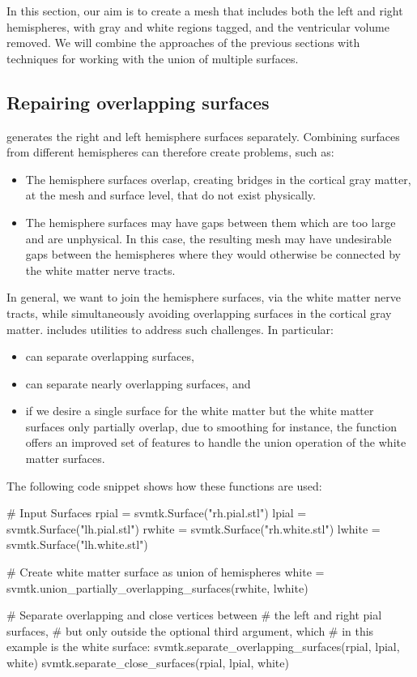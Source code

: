 In this section, our aim is to create a mesh that includes both the
left and right hemispheres, with gray and white regions tagged, and
the ventricular volume removed. We will combine the approaches of the
previous sections with \svmtk{} techniques for
working with the union of multiple surfaces. 

\subsection{Repairing overlapping surfaces}
\freesurfer{} generates the right and left hemisphere surfaces
separately. Combining surfaces from different hemispheres
can therefore create problems, such as:
\begin{itemize}
\item The hemisphere surfaces overlap, creating bridges in the cortical gray 
matter, at the mesh and surface level, that do not exist physically.
\item The hemisphere surfaces may have gaps between them which are too large 
and are unphysical. In this case, the resulting mesh may have undesirable gaps 
between the hemispheres where they would otherwise be connected by the 
white matter nerve tracts. 
\end{itemize} 
In general, we want to join the hemisphere surfaces, via the white
matter nerve tracts, while simultaneously avoiding overlapping
surfaces in the cortical gray matter. \svmtk{} includes utilities to
address such challenges. In particular:
\begin{itemize}
\item
   can separate
  overlapping surfaces,
\item
   can separate nearly
  overlapping surfaces, and
\item
  if we desire a single surface for the white matter but the white
  matter surfaces only partially overlap, due to smoothing for
  instance, the \svmtk{} function
   offers an
  improved set of features to handle the union operation of the white
  matter surfaces.
\end{itemize}
The following code snippet shows how these functions are used:
\begin{python}
# Input Surfaces
rpial = svmtk.Surface("rh.pial.stl")
lpial = svmtk.Surface("lh.pial.stl")
rwhite = svmtk.Surface("rh.white.stl")
lwhite = svmtk.Surface("lh.white.stl")

# Create white matter surface as union of hemispheres
white = svmtk.union_partially_overlapping_surfaces(rwhite,
                                                   lwhite)

# Separate overlapping and close vertices between
# the left and right pial surfaces,
# but only outside the optional third argument, which
# in this example is the white surface:
svmtk.separate_overlapping_surfaces(rpial, lpial, white)
svmtk.separate_close_surfaces(rpial, lpial, white) 
\end{python} 

